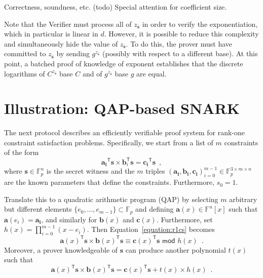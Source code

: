 \documentclass{article}
\theoremstyle{definition}
\begin{document}
Correctness, soundness, etc. (todo) Special attention for coefficient size.

Note that the Verifier must process all of $z_{\bar{\mathbf{s}}}$ in order to verify the exponentiation, which in particular is linear in $d$. However, it is possible to reduce this complexity and simultaneously hide the value of $z_{\bar{\mathbf{s}}}$. To do this, the prover must have committed to $z_{\bar{\mathbf{s}}}$ by sending $g^{z_{\bar{\mathbf{s}}}}$ (possibly with respect to a different base). At this point, a batched proof of knowledge of exponent establishes that the discrete logarithms of $C^{z_{\bar{\mathbf{s}}}}$ base $C$ and of $g^{z_{\bar{\mathbf{s}}}}$ base $g$ are equal.

\section{Illustration: QAP-based SNARK}

The next protocol describes an efficiently verifiable proof system for rank-one constraint satisfaction problems. Specifically, we start from a list of $m$ constraints of the form
\begin{equation} \label{equation:r1cs}
    \mathbf{a_i}^\mathsf{T} \mathbf{s} \times \mathbf{b}_i^\mathsf{T} \mathbf{s} = \mathbf{c_i}^\mathsf{T} \mathbf{s} \enspace ,
\end{equation}
where $\mathbf{s} \in \mathbb{F}_p^n$ is the secret witness and the $m$ triples $(\mathbf{a_i}, \mathbf{b_i}, \mathbf{c_i})_{i=0}^{m-1} \in \mathbb{F}_p^{3 \times m \times n}$ are the known parameters that define the constraints. Furthermore, $s_0 = 1$.

Translate this to a quadratic arithmetic program (QAP) by selecting $m$ arbitrary but different elements $\{e_0, \ldots, e_{m-1}\} \subset \mathbb{F}_p$ and defining $\mathbf{a}(x) \in \mathbb{F}^n[x]$ such that $\mathbf{a}(e_i) = \mathbf{a_i}$, and similarly for $\mathbf{b}(x)$ and $\mathbf{c}(x)$. Furthermore, set $h(x) = \prod_{i=0}^{m-1} (x-e_i)$. Then Equation~\ref{equation:r1cs} becomes
\begin{equation} \label{equation:qap_modular}
    \mathbf{a}(x)^\mathsf{T}\mathbf{s} \times \mathbf{b}(x)^\mathsf{T}\mathbf{s} \equiv \mathbf{c}(x)^\mathsf{T}\mathbf{s} \,\, \mathsf{mod} \,\, h(x) \enspace .
\end{equation}
Moreover, a prover knowledgeable of $\mathbf{s}$ can produce another polynomial $t(x)$ such that
\begin{equation} \label{equation:qap_explicit}
    \mathbf{a}(x)^\mathsf{T}\mathbf{s} \times \mathbf{b}(x)^\mathsf{T}\mathbf{s} = \mathbf{c}(x)^\mathsf{T}\mathbf{s} + t(x) \times h(x) \enspace .
\end{equation}
\end{document}
